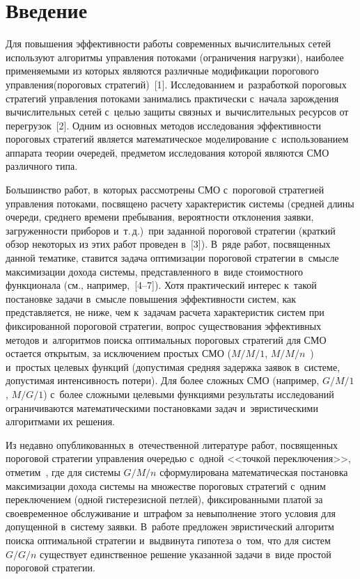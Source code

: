 
\thispagestyle{headings}

\begin{multicols}{2}

\label{st\stat}
  
  
  \section{Введение}
  
  Для повышения эффективности работы современных вычислительных сетей 
используют алгоритмы управления потоками (ограничения нагрузки), наиболее 
применяемыми из которых являются различные модификации порогового 
управления\linebreak (пороговых стратегий)~[1]. Исследованием и~разработкой 
пороговых стратегий управления потоками занимались практически с~начала 
зарождения вычислительных сетей с~целью защиты \mbox{связных} и~вычислительных 
ресурсов от перегрузок~[2]. Одним из основных методов исследования 
эф\-фек\-тив\-ности пороговых стратегий является математическое моделирование 
с~использованием аппарата теории очередей, предметом исследования которой 
являются СМО различного типа.
  
  Большинство работ, в~которых рассмотрены СМО с~пороговой стратегией 
управления потоками, посвящено расчету характеристик системы (средней 
длины очереди, среднего времени пребывания, вероятности отклонения заявки, 
загруженности приборов и~т.\,д.)\ при заданной пороговой стратегии (краткий 
обзор некоторых из этих работ проведен в~[3]). В~ряде работ, посвященных 
данной тематике, ставится задача оптимизации пороговой стратегии в~смысле 
максимизации дохода системы, представленного в~виде стоимостного 
функционала (см., например,~[4--7]). Хотя практический интерес к~такой 
постановке задачи в~смысле повышения эффективности сис\-тем, как 
представляется, не ниже, чем к~задачам расчета характеристик систем при 
фиксированной пороговой стратегии, вопрос существования эффективных 
методов и~алгоритмов поиска оптимальных пороговых стратегий для СМО 
остается открытым, за исключением простых СМО ($M/M/1$,  
$M/M/n$~\cite{4-aga}) и~простых целевых функций (допустимая средняя 
задержка заявок в~системе, допустимая интенсивность потери). Для более 
сложных СМО (например, $G/M/1$, $M/G/1$) с~более сложными целевыми 
функциями результаты исследований ограничиваются математическими 
постановками задач и~эвристическими алгоритмами их решения. 

Из недавно 
опубликованных в~отечественной литературе работ, посвященных пороговой 
стратегии управ\-ле\-ния очередью с~одной <<точкой переключения>>, 
отметим~\cite{5-aga}, где для сис\-те\-мы $G/M/n$ сформулирована 
математическая постановка максимизации дохода сис\-те\-мы на множестве 
пороговых стратегий с~одним переключением (одной гис\-те\-ре\-зис\-ной петлей), 
фиксированными платой за своевременное обслуживание и~штрафом за 
невыполнение этого условия для допущенной в~систему заявки. В~работе 
предложен эвристический алгоритм поиска оптимальной стратегии 
и~выдвинута гипотеза о~том, что для сис\-тем $G/G/n$ существует единственное 
решение указанной задачи в~виде простой пороговой стратегии. 


\end{multicols}
